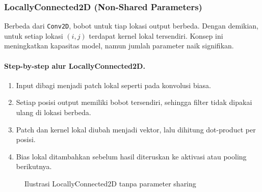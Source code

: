 \subsubsection{LocallyConnected2D (Non-Shared Parameters)}
Berbeda dari \texttt{Conv2D}, bobot untuk tiap lokasi output berbeda. Dengan demikian, untuk setiap lokasi $(i,j)$ terdapat kernel lokal tersendiri. Konsep ini meningkatkan kapasitas model, namun jumlah parameter naik signifikan.

\paragraph{Step-by-step alur LocallyConnected2D.}
\begin{enumerate}
    \item Input dibagi menjadi patch lokal seperti pada konvolusi biasa.
    \item Setiap posisi output memiliki bobot tersendiri, sehingga filter tidak dipakai ulang di lokasi berbeda.
    \item Patch dan kernel lokal diubah menjadi vektor, lalu dihitung dot-product per posisi.
    \item Bias lokal ditambahkan sebelum hasil diteruskan ke aktivasi atau pooling berikutnya.
\end{enumerate}

\begin{figure}[H]
    \centering
    \caption{Ilustrasi LocallyConnected2D tanpa parameter sharing}
    \label{fig:locally-connected-diagram}
\end{figure}

